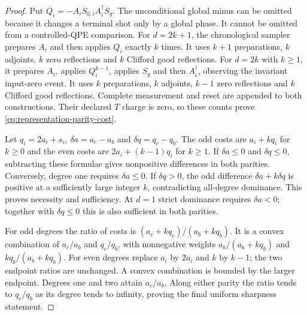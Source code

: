 \documentclass[11pt]{article}
\begin{document}
\begin{proof}
Put $Q_i=-A_iS_{0,i}A_i^\dagger S_g$. The unconditional global minus
can be omitted because it changes a terminal shot only by a global
phase. It cannot be omitted from a controlled-QPE comparison. For
$d=2k+1$, the chronological sampler prepares $A_i$ and then applies
$Q_i$ exactly $k$ times. It uses $k+1$ preparations, $k$ adjoints,
$k$ zero reflections and $k$ Clifford good reflections. For $d=2k$
with $k\geq1$, it prepares $A_i$, applies $Q_i^{k-1}$, applies $S_g$
and then $A_i^\dagger$, observing the invariant input-zero event. It
uses $k$ preparations, $k$ adjoints, $k-1$ zero reflections and $k$
Clifford good reflections. Complete measurement and reset are appended
to both constructions. Their declared $T$ charge is zero, so these
counts prove \eqref{eq:representation-parity-cost}.

Let $q_i=2a_i+s_i$, $\delta a=a_c-a_b$ and $\delta q=q_c-q_b$.
The odd costs are $a_i+kq_i$ for $k\geq0$ and the even costs are
$2a_i+(k-1)q_i$ for $k\geq1$. If $\delta a\leq0$ and
$\delta q\leq0$, subtracting these formulae gives nonpositive
differences in both parities. Conversely, degree one requires
$\delta a\leq0$. If $\delta q>0$, the odd difference
$\delta a+k\delta q$ is positive at a sufficiently large integer
$k$, contradicting all-degree dominance. This proves necessity and
sufficiency. At $d=1$ strict dominance requires $\delta a<0$; together
with $\delta q\leq0$ this is also sufficient in both parities.

For odd degrees the ratio of costs is
$(a_c+kq_c)/(a_b+kq_b)$. It is a convex combination of $a_c/a_b$
and $q_c/q_b$, with nonnegative weights
$a_b/(a_b+kq_b)$ and $kq_b/(a_b+kq_b)$. For even degrees replace
$a_i$ by $2a_i$ and $k$ by $k-1$; the two endpoint ratios are
unchanged. A convex combination is bounded by the larger endpoint.
Degrees one and two attain $a_c/a_b$. Along either parity the ratio
tends to $q_c/q_b$ as its degree tends to infinity, proving the final
uniform sharpness statement.
\end{proof}
\end{document}
